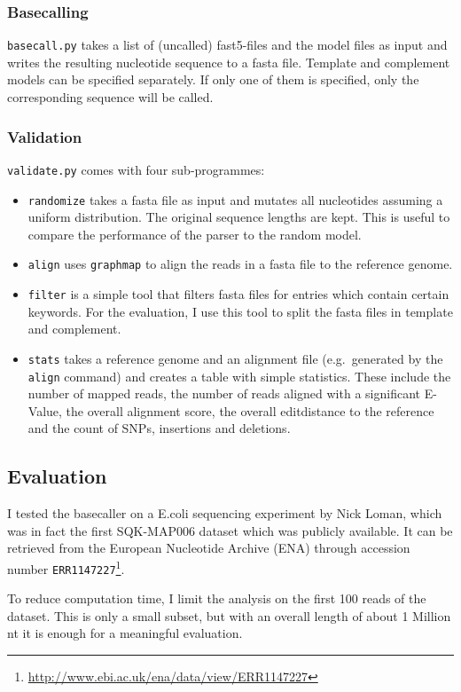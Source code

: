\documentclass[]{scrartcl}
\begin{document}
\subsubsection{Basecalling}
\texttt{basecall.py} takes a list of (uncalled) fast5-files and the model files as input and writes the resulting nucleotide sequence to a fasta file. Template and complement models can be specified separately. If only one of them is specified, only the corresponding sequence will be called. 

\subsubsection{Validation}
\texttt{validate.py} comes with four sub-programmes:
\begin{itemize}
\item \texttt{randomize} takes a fasta file as input and mutates all nucleotides assuming a uniform distribution. The original sequence lengths are kept. This is useful to compare the performance of the parser to the random model. 
\item \texttt{align} uses \texttt{graphmap} to align the reads in a fasta file to the reference genome. 
\item \texttt{filter} is a simple tool that filters fasta files for entries which contain certain keywords. For the evaluation, I use this tool to split the fasta files in template and complement. 
\item \texttt{stats} takes a reference genome and an alignment file (e.g.\ generated by the \texttt{align} command) and creates a table with simple statistics. These include the number of mapped reads, the number of reads aligned with a significant E-Value, the overall alignment score, the overall editdistance to the reference and the count of SNPs, insertions and deletions. 
\end{itemize}

\subsection{Evaluation}
I tested the basecaller on a E.coli sequencing experiment by Nick Loman, which was in fact the first SQK-MAP006 dataset which was publicly available. It can be retrieved from the European Nucleotide Archive (ENA) through accession number \texttt{ERR1147227}\footnote{\url{http://www.ebi.ac.uk/ena/data/view/ERR1147227}}. 

To reduce computation time, I limit the analysis on the first 100 reads of the dataset. This is only a small subset, but with an overall length of about 1 Million nt it is enough for a meaningful evaluation. 
\end{document}
